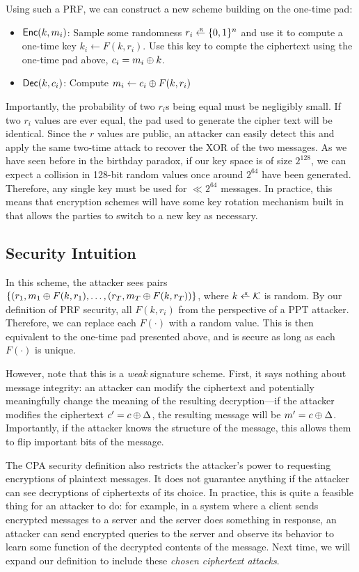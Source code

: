 Using such a PRF, we can construct a new scheme building on the one-time pad:

\begin{itemize}
	\item $\mathsf{Enc}(k, m_i)$: Sample some randomness $r_i \rgets \bin^n$ and use it to compute a one-time key $k_i \gets F(k, r_i)$. Use this key to compte the ciphertext using the one-time pad above, $c_i = m_i \oplus k$.
	\item $\mathsf{Dec}(k, c_i)$: Compute $m_i \gets c_i \oplus F(k, r_i)$
\end{itemize}

Importantly, the probability of two $r_i$s being equal must be negligibly small. If two $r_i$ values are ever equal, the pad used to generate the cipher text will be identical. Since the $r$ values are public, an attacker can easily detect this and apply the same two-time attack to recover the XOR of the two messages. As we have seen before in the birthday paradox, if our key space is of size $2^{128}$, we can expect a collision in 128-bit random values once around $2^{64}$ have been generated. Therefore, any single key must be used for $\ll 2^{64}$ messages. In practice, this means that encryption schemes will have some key rotation mechanism built in that allows the parties to switch to a new key as necessary.

\subsection{Security Intuition}
In this scheme, the attacker sees pairs $\left\{ (r_1, m_1 \oplus F(k, r_1), \ldots, (r_T, m_T \oplus F(k, r_T)) \right\}$, where $k \rgets \calK$ is random. By our definition of PRF security, all $F(k, r_i)$  from the perspective of a PPT attacker. Therefore, we can replace each $F(\cdot)$ with a random value. This is then equivalent to the one-time pad presented above, and is secure as long as each $F(\cdot)$ is unique.

	However, note that this is a \emph{weak} signature scheme. First, it says nothing about message integrity: an attacker can modify the ciphertext and potentially meaningfully change the meaning of the resulting decryption---if the attacker modifies the ciphertext $c' = c \oplus \Delta$, the resulting message will be $m' = c \oplus \Delta$. Importantly, if the attacker knows the structure of the message, this allows them to flip important bits of the message.

	The CPA security definition also restricts the attacker's power to requesting encryptions of plaintext messages. It does not guarantee anything if the attacker can see decryptions of ciphertexts of its choice. In practice, this is quite a feasible thing for an attacker to do: for example, in a system where a client sends encrypted messages to a server and the server does something in response, an attacker can send encrypted queries to the server and observe its behavior to learn some function of the decrypted contents of the message. Next time, we will expand our definition to include these \textit{chosen ciphertext attacks}.
